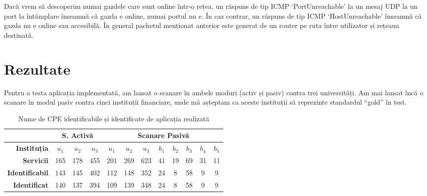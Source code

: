 	Dacă vrem să descoperim numai gazdele care sunt online într-o rețea, un răspuns de tip ICMP `PortUnreachable' la un mesaj UDP la un port la întâmplare înseamnă că gazda e online, numai portul nu e. În caz contrar, un răspuns de tip ICMP `HostUnreachable' înseamnă că gazda nu e online sau accesibilă. În general pachetul menționat anterior este generat de un router pe ruta între utilizator și rețeaua destinată.

\section*{Rezultate}

	Pentru a testa aplicația implementată, am lansat o scanare în ambele moduri (activ și pasiv) contra trei universități. Am mai lansat încă o scanare în modul pasiv contra cinci instituții financiare, unde mă așteptam ca aceste instituții să reprezinte standardul ``gold'' în test.

	\begin{table}[H]
		\centering
		\begin{tabular}{r|ccc|ccc|ccccc|}
			\cline{2-12}
			\multicolumn{1}{l|}{}                         & \multicolumn{3}{c|}{\textbf{S. Activă}} & \multicolumn{8}{c|}{\textbf{Scanare Pasivă}}                                                             \\ \hline
			\multicolumn{1}{|r|}{\textbf{Instituția}}      & \textbf{$u_1$}    & \textbf{$u_2$}    & \textbf{$u_3$}   & \textbf{$u_1$} & \textbf{$u_2$} & \textbf{$u_3$} & \textbf{$b_1$} & \textbf{$b_2$} & \textbf{$b_3$} & \textbf{$b_4$} & \textbf{$b_5$} \\ \hline
			\multicolumn{1}{|r|}{\textbf{Servicii}} & 165            & 178            & 455           & 201         & 269         & 623         & 41          & 19          & 69          & 31          & 11          \\
			\multicolumn{1}{|r|}{\textbf{Identificabil}} & 143            & 145            & 402           & 112         & 148         & 352         & 24          & 8           & 58          & 9           & 9           \\
			\multicolumn{1}{|r|}{\textbf{Identificat}}   & 140            & 137            & 394           & 109         & 139         & 348         & 24          & 8           & 58          & 9           & 9           \\ \hline
		\end{tabular}
		\caption{Nume de CPE identificabile și identificate de aplicația realizată}
		\label{cpeids_ro}
	\end{table}
	
